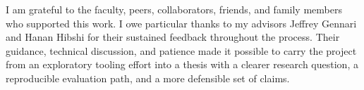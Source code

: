 \acknowledgements

I am grateful to the faculty, peers, collaborators, friends, and family members who supported this work. I owe particular thanks to my advisors Jeffrey Gennari and Hanan Hibshi for their sustained feedback throughout the process. Their guidance, technical discussion, and patience made it possible to carry the project from an exploratory tooling effort into a thesis with a clearer research question, a reproducible evaluation path, and a more defensible set of claims.
